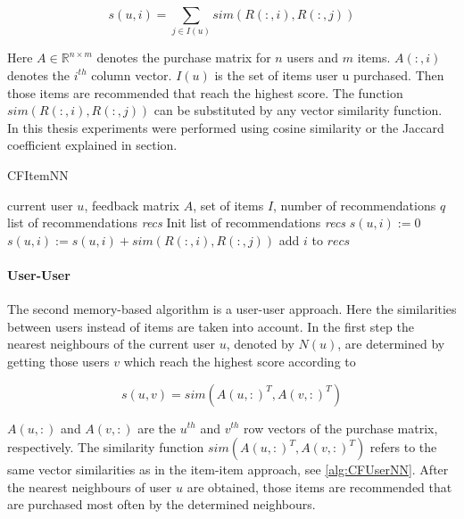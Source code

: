 \documentclass[10pt]{reportMaster}
\begin{document}
\begin{equation}
	 s(u,i) = \sum_{j \in I(u)}{sim(R(:,i), R(:,j))}
\end{equation}

Here $A \in \mathds{R}^{n \times m}$ denotes the purchase matrix for $n$ users and $m$ items. $A(:,i)$ denotes the $i^{th}$ column vector. $I(u)$ is the set of items user u purchased.
Then those items are recommended that reach the highest score.
The function $sim(R(:,i), R(:,j))$ can be substituted by any vector similarity function.
In this thesis experiments were performed using cosine similarity or the Jaccard coefficient explained in section. %

\begin{algorithm}
	\caption{CFItemNN}
	\label{alg:CFItemNN}
	\begin{algorithmic}[1]
		\Require current user $u$, feedback matrix $A$, set of items $I$, number of recommendations $q$
		\Ensure list of recommendations \textit{recs}
		\State Init list of recommendations \textit{recs}
			\State $s(u,i) := 0$
				\State $s(u,i) := s(u,i) + sim(R(:,i), R(:,j))$ 
			\EndFor
				\State add $i$ to $recs$
			\EndIf
		\EndFor
	\end{algorithmic}	
\end{algorithm}


\paragraph{User-User}
The second memory-based algorithm is a user-user approach. %
Here the similarities between users instead of items are taken into account.
In the first step the nearest neighbours of the current user $u$, denoted by $N(u)$, are determined by getting those users $v$ which reach the highest score according to

\begin{equation}
	s(u,v) = sim(A(u,:)^T, A(v, :)^T)
\end{equation}

$A(u,:)$ and $A(v,:)$ are the $u^{th}$ and $v^{th}$ row vectors of the purchase matrix, respectively.
The similarity function $sim(A(u,:)^T, A(v, :)^T)$ refers to the same vector similarities as in the item-item approach, see \ref{alg:CFUserNN}.
After the nearest neighbours of user $u$ are obtained, those items are recommended that are purchased most often by the determined neighbours.
\end{document}
